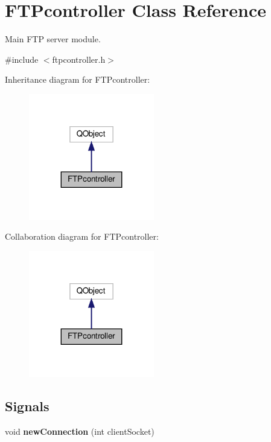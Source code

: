\hypertarget{classFTPcontroller}{}\section{F\+T\+Pcontroller Class Reference}
\label{classFTPcontroller}


Main F\+TP server module.  




{\ttfamily \#include $<$ftpcontroller.\+h$>$}



Inheritance diagram for F\+T\+Pcontroller\+:\nopagebreak
\begin{figure}[H]
\begin{center}
\leavevmode
\includegraphics[width=155pt]{d8/d5c/classFTPcontroller__inherit__graph}
\end{center}
\end{figure}


Collaboration diagram for F\+T\+Pcontroller\+:\nopagebreak
\begin{figure}[H]
\begin{center}
\leavevmode
\includegraphics[width=155pt]{d9/d30/classFTPcontroller__coll__graph}
\end{center}
\end{figure}
\subsection*{Signals}
\begin{DoxyCompactItemize}
\item 
\mbox{\label{classFTPcontroller_a83ed496fc32dff4f3257098b0589dd85}} 
void {\bfseries new\+Connection} (int client\+Socket)
\end{DoxyCompactItemize}
